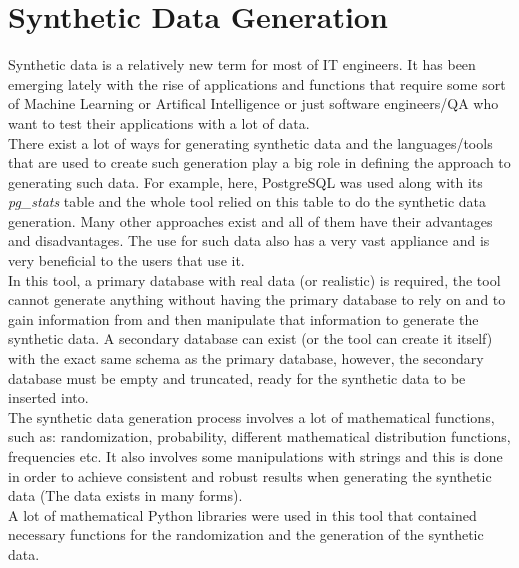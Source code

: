 \section{Synthetic Data Generation}
Synthetic data is a relatively new term for most of IT engineers. It has been emerging lately with the rise of applications and functions that require some sort of Machine Learning or Artifical Intelligence or just software engineers/QA who want to test their applications with a lot of data.\\
\newline
There exist a lot of ways for generating synthetic data and the languages/tools that are used to create such generation play a big role in defining the approach to generating such data. For example, here, PostgreSQL was used along with its \textit{pg\_stats} table and the whole tool relied on this table to do the synthetic data generation. Many other approaches exist and all of them have their advantages and disadvantages. The use for such data also has a very vast appliance and is very beneficial to the users that use it.\\
\newline
In this tool, a primary database with real data (or realistic) is required, the tool cannot generate anything without having the primary database to rely on and to gain information from and then manipulate that information to generate the synthetic data. A secondary database can exist (or the tool can create it itself) with the exact same schema as the primary database, however, the secondary database must be empty and truncated, ready for the synthetic data to be inserted into.\\
\newline
The synthetic data generation process involves a lot of mathematical functions, such as: randomization, probability, different mathematical distribution functions, frequencies etc. It also involves some manipulations with strings and this is done in order to achieve consistent and robust results when generating the synthetic data (The data exists in many forms).\\
A lot of mathematical Python libraries were used in this tool that contained necessary functions for the randomization and the generation of the synthetic data.
\newpage
